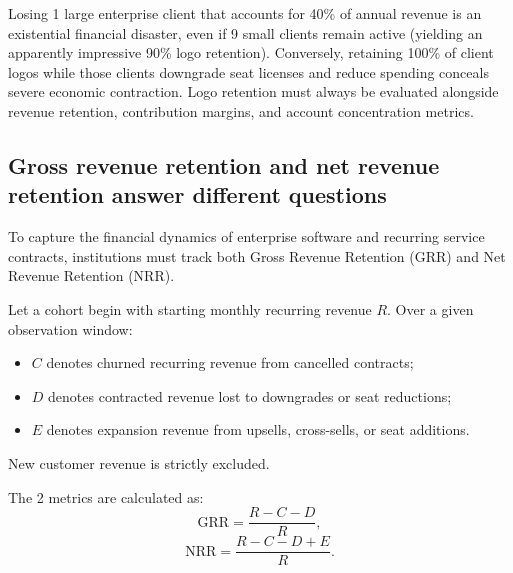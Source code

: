 Losing 1 large enterprise client that accounts for 40\% of annual revenue is an existential financial disaster, even if 9 small clients remain active (yielding an apparently impressive 90\% logo retention). Conversely, retaining 100\% of client logos while those clients downgrade seat licenses and reduce spending conceals severe economic contraction. Logo retention must always be evaluated alongside revenue retention, contribution margins, and account concentration metrics.

\subsection{Gross revenue retention and net revenue retention answer different questions}

To capture the financial dynamics of enterprise software and recurring service contracts, institutions must track both Gross Revenue Retention (GRR) and Net Revenue Retention (NRR).

Let a cohort begin with starting monthly recurring revenue $R$. Over a given observation window:
\begin{itemize}
\item $C$ denotes churned recurring revenue from cancelled contracts;
\item $D$ denotes contracted revenue lost to downgrades or seat reductions;
\item $E$ denotes expansion revenue from upsells, cross-sells, or seat additions.
\end{itemize}
New customer revenue is strictly excluded.

The 2 metrics are calculated as:
\begin{equation}
\text{GRR} = \frac{R - C - D}{R},
\end{equation}
\begin{equation}
\text{NRR} = \frac{R - C - D + E}{R}.
\end{equation}

